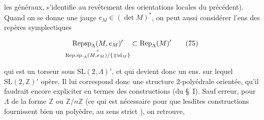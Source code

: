 

les  généraux, s'identifie au revêtement des orientations locales du précédent). Quand on se donne une jauge $e_M\in(\det M)^*$, on peut aussi considérer l'ens des repères symplectiques

\[
\underset{\substack{\shortparallel\\\mathrm{Rep.sp.}_\Lambda(M,e_M)/\{\pm\mathrm{id}_M\}}}{\operatorname{Repsp}_\Lambda(M,e_M)'}\subset\operatorname{Rep}_\Lambda(M)'\tag*{(75)}
\]

qui est un torseur sous $\mathrm{SL}(2,\Lambda)'$, et qui devient donc un ens. sur lequel $\mathrm{SL}(2,\mathbb{Z})'$ opère. Il lui correspond donc une structure $2$-polyédrale orientée, qu'il faudrait encore expliciter en termes des constructions  (du \S\ I). Sauf erreur, pour $\Lambda$ de la forme $\mathbb{Z}$ ou $\mathbb{Z}/n\mathbb{Z}$ (ce qui est nécessaire pour que lesdites constructions fournissent bien un polyèdre, au sens strict ), on retrouve,

